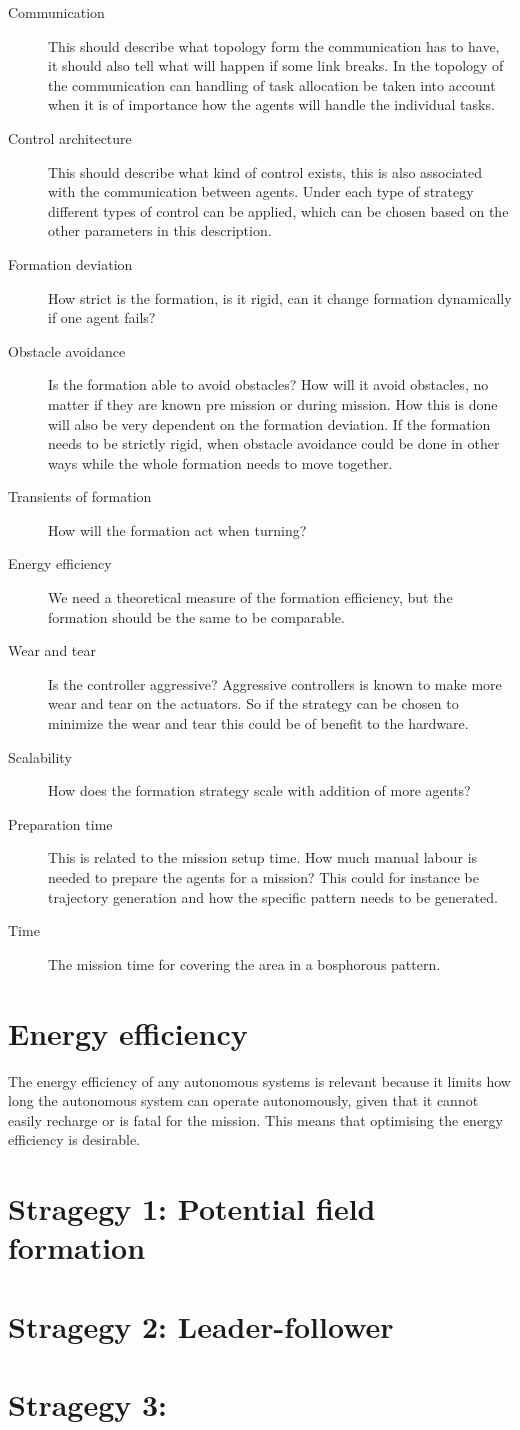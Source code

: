 \begin{description}
\item[Communication] This should describe what topology form the communication has to have, it should also tell what will happen if some link breaks. In the topology of the communication can handling of task allocation be taken into account when it is of importance how the agents will handle the individual tasks.
\item[Control architecture] This should describe what kind of control exists, this is also associated with the communication between agents. Under each type of strategy different types of control can be applied, which can be chosen based on the other parameters in this description.
\item[Formation deviation] How strict is the formation, is it rigid, can it change formation dynamically if one agent fails?
\item[Obstacle avoidance] Is the formation able to avoid obstacles? How will it avoid obstacles, no matter if they are known pre mission or during mission. How this is done will also be very dependent on the formation deviation. If the formation needs to be strictly rigid, when obstacle avoidance could be done in other ways while the whole formation needs to move together.
\item[Transients of formation] How will the formation act when turning?
\item[Energy efficiency] We need a theoretical measure of the formation efficiency, but the formation should be the same to be comparable.
\item[Wear and tear] Is the controller aggressive? Aggressive controllers is known to make more wear and tear on the actuators. So if the strategy can be chosen to minimize the wear and tear this could be of benefit to the hardware.
\item[Scalability] How does the formation strategy scale with addition of more agents?
\item[Preparation time] This is related to the mission setup time. How much manual labour is needed to prepare the agents for a mission? This could for instance be trajectory generation and how the specific pattern needs to be generated.
\item[Time] The mission time for covering the area in a bosphorous pattern.
\end{description}

\section{Energy efficiency}
The energy efficiency of any autonomous systems is relevant because it limits how long the autonomous system can operate autonomously, given that it cannot easily recharge or is fatal for the mission. This means that optimising the energy efficiency is desirable.

\section{Stragegy 1: Potential field formation}
\section{Stragegy 2: Leader-follower}
\section{Stragegy 3: }


